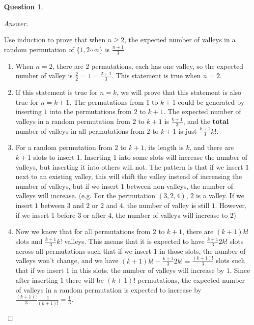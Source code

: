 \documentclass{article}
\theoremstyle{plain}
\newtheorem{question}{Question}
\newenvironment{answer}[1][Answer]
    {\begin{proof}[#1]{$ $}\renewcommand\qedsymbol{$\vartriangle$}}
    {\end{proof}}
\begin{document}
\begin{question}
\end{question}
\begin{answer}
    \begin{enumerate}
        Use induction to prove  that when $n \geq 2$, the expected number of valleys in a random permutation of $\{ 1,2 \cdots n\}$ is $\displaystyle\frac{n+1}{3}$
        \begin{enumerate}
            \item When $n=2$, there are 2 permutations, each has one valley, so the expected number of valley is $\displaystyle\frac{2}{2} = 1 = \frac{2+1}{3}$. This statement is true when $n = 2$.
            \item If this statement is true for $n = k$, we will prove that this statement is also true for $n = k + 1$. The permutations from $1$ to $k + 1$ could be generated by inserting $1$ into the permutations from $2$ to $k + 1$. The expected number of valleys in a random permutation from $2$ to $k + 1$ is $\displaystyle\frac{k + 1}{3}$, and the \textbf{total} number of valleys in all permutations from $2$ to $k + 1$ is just $\displaystyle\frac{k + 1}{3} k!$.
            \item For a random permutation from $2$ to $k + 1$, its length is $k$, and there are $k+1$ slots to insert $1$. Inserting $1$ into some slots will increase the number of valleys, but inserting it into others will not. The pattern is that if we insert $1$ next to an existing valley, this will shift the valley instead of increasing the number of valleys, but if we insert $1$ between non-valleys, the number of valleys will increase. (e.g. For the permutation $(3,2,4)$, $2$ is a valley. If we insert $1$ between $3$ and $2$ or $2$ and $4$, the number of valley is still $1$.  However, if we insert $1$ before $3$ or after $4$, the number of valleys will increase to $2$)
            \item Now we know that for all permutations from $2$ to $k + 1$, there are $(k + 1)k!$ slots and $\displaystyle\frac{k + 1}{3} k!$ valleys. This means that it is expected to have $\displaystyle\frac{k + 1}{3}2k!$ slots across all permutations such that if we insert $1$ in those slots, the number of valleys won't change, and we have $\displaystyle (k+1)k!-\frac{k + 1}{3}2k! = \frac{(k+1)!}{3}$ slots such that if we insert $1$ in this slots, the number of valleys will increase by $1$. Since after inserting $1$ there will be $(k + 1)!$ permutations, the expected number of valleys in a random permutation is expected to increase by $\displaystyle\frac{(k+1)!}{3} \frac{1}{(k+1)!} = \frac{1}{3}$.

\end{enumerate}
\end{enumerate}
\end{answer}
\end{document}
